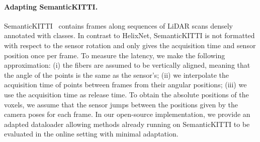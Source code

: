 \documentclass[runningheads]{tpls/llncs}
\begin{document}
\paragraph{Adapting SemanticKITTI.}
SemanticKITTI~\cite{behley2019iccv,Geiger2013IJRR} contains   frames along  sequences of LiDAR scans densely annotated with  classes. In contrast to HelixNet, SemanticKITTI is not formatted with respect to the sensor rotation and only gives the acquisition time and sensor position once per frame. To measure the latency, we make the following approximation:
(i) the fibers are assumed to be vertically aligned, meaning that the angle of the points is the same as the sensor's;
(ii) we interpolate the acquisition time of points between frames from their angular positions;
(iii) we use the acquisition time as release time.
To obtain the absolute positions of the voxels, we assume that the sensor jumps between the positions given by the camera poses for each frame. In our open-source implementation, we provide an adapted dataloader allowing methods already running on SemanticKITTI to be evaluated in the online setting with minimal adaptation.
\end{document}
